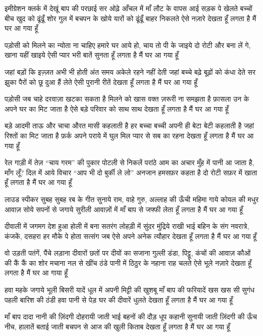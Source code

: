 इमीग्रेशन क्लर्क में देखूं बाप की परछाई
सर ओढ़े आँचल में माँ लौट के वापस आई
सड़क पे खेलते बच्चों बीच खुद को ढूंढूँ
शोर गुल में बचपन के खोये यारों को ढूंढूँ
बाहर निकलते ऐसे नज़ारे देखता हूँ
लगता है मैं घर आ गया हूँ

पड़ोसी को मिलने का न्योता ना चाहिए
हमारे घर आये हो, चाय तो पी के जाइये
दो रोटी और बना लें गे, खाना यहीं खाइये
ऐसी प्यार भरी बातें सुनता हूँ
लगता है मैं घर आ गया हूँ

जहां बड़ों कि इज़्ज़त अभी भी होती
अंत समय अकेले रहने नहीं देती
जहां बच्चे बढ़े बूढ़ों को कंधा देते
सर झुका पैरों को छू दुआ हैं लेते
ऐसी पुरानी रीतें देखता हूँ
लगता है मैं घर आ गया हूँ

पड़ोसी जब चाहे दरवाज़ा खटका सकता है
मिलने को खास वक्त ज़रूरी ना समझता है
फ़ासला उन के अपने घर का मिट जाता है
ऐसे बड़े परिवार को साथ साथ देखता हूँ
लगता है मैं घर आ गया हूँ

   




बड़े आदमी ताऊ और चाचा औरत
 मासी कहलाती है
हर बच्चा बच्ची अपनी ही बेटा 
बेटी कहलाती है
जहां रिश्तों का मिट जाता है फ़र्क 
अपने पराये में
 घुल मिल प्यार से सब का रहना देखता हूँ
लगता है मैं घर आ गया हूँ

रेल गाड़ी में तेज़ “चाय गरम” की पुकार
पोटली से निकलें परांठे आम का अचार
मुँह में पानी आ जाता है, माँग लूँ?
दिल में आये विचार
“आप भी दो बुर्की ले लो”
अनजान हमसफ़र कहता है
दो रोटी सफ़र में खाता हूँ
लगता है मैं घर आ गया हूँ



लाउड स्पीकर सुबह सुबह रब के गीत सुनाये
राम, वाहे गुरु, अल्लाह की ऊँची महिमा गाये
कोयल की मधुर आवाज़ सोये सपनों से जगाये
सुरीली आवाज़ों में माँ बाप से जफ्फी लेता हूँ
लगता है मैं घर आ गया हूँ




दीवाली में जगमग देश हुआ होली में बना सतरंग
लोहड़ी में सुंदर मुंद्रिये राखी भाई बहिन के
संग
नवरात्रे, कंजकें, दसहरा हर मौके पे होता
सत्संग
जब ऐसे अपने अनेक त्यौहार देखता हूँ
लगता है मैं घर आ गया हूँ

वो उड़ती पतंगें, पैंचे लड़ाना
दीवारों छतों पर दीयों का सजाना
गुल्ली डंडा, पिट्ठू, कंचों की आवाज़
कौओं की कैं कैं का शोर मचाना
नल से खींच ठंडे पानी में
ठिठुर के नहाना
राह चलते ऐसे भूले नज़ारे देखता हूँ
लगता है मैं घर आ गाया हूँ

हवा महके जगाये भूली बिसरी यादें
धूल में अपनी मिट्टी की खुशबू
माँ बाप की फरियादें
खस खस सी सुगंध पहली बारिश की
ठंडी हवा
पानी से पेड़ घर की दीवारें धुलते देखता हूँ
लगता है मैं घर आ गया हूँ

माँ बाप दादा नानी की ज़िंदगी दोहरायी जाती
भाई बहनों की दौड़ धूप कहानी सुनायी जाती
ज़िंदगी की ऊँच नीच, हालातें बताई जाती
बचपन से आज की खुली किताब देखता हूँ
लगता है मैं घर आ गया हूँ

